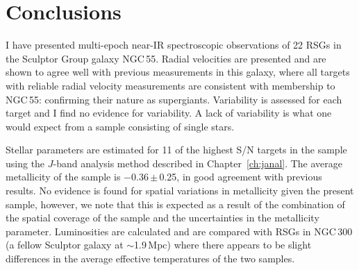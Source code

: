 


\section{Conclusions} %
\label{sec:ngc55conc}

I have presented multi-epoch near-IR spectroscopic observations of 22 RSGs in the Sculptor Group galaxy NGC\,55.
Radial velocities are presented and are shown to agree well with previous measurements in this galaxy, where all targets with reliable radial velocity measurements are consistent with membership to NGC\,55: confirming their nature as supergiants.
Variability is assessed for each target and I find no evidence for variability. A lack of variability is what one would expect from a sample consisting of single stars.

Stellar parameters are estimated for 11 of the highest S/N targets in the sample using the $J$-band analysis method described in Chapter~\ref{ch:janal}.
The average metallicity of the sample is $-$0.36\,$\pm$\,0.25, in good agreement with previous results.
No evidence is found for spatial variations in metallicity given the present sample, however, we note that this is expected as a result of the combination of the spatial coverage of the sample and the uncertainties in the metallicity parameter.
Luminosities are calculated and are compared with RSGs in NGC\,300 (a fellow Sculptor galaxy at $\sim$1.9\,Mpc) where there appears to be slight differences in the average effective temperatures of the two samples.



% 